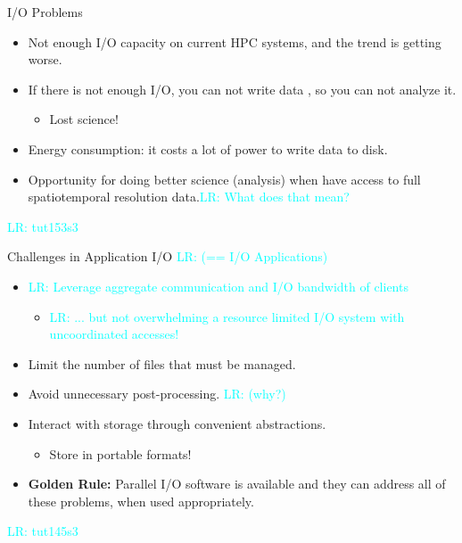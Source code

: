 \documentclass[compress,11pt,xcolor=svgnames,aspectratio=169]{beamer}
\newcommand{\lr}[1]{\textcolor{cyan}{LR: #1}}
\begin{document}
\begin{frame}[fragile]{I/O Problems}

\begin{itemize}
\setlength\itemsep{0.7cm}

\item Not enough I/O capacity on current HPC systems, and the trend is getting worse.

\item If there is not enough I/O, you can not write data%
, so you can not analyze it.
    \begin{itemize}
        \item Lost science!
    \end{itemize}

\item Energy consumption: it costs a lot of power to write data to disk.

\item Opportunity for doing better science (analysis) when have access to full spatiotemporal resolution data.\lr{What does that mean?}

\end{itemize}

\lr{tut153s3}

\end{frame}

\begin{frame}[fragile]{Challenges in Application I/O \lr{(== I/O Applications)}}

\begin{itemize}
\setlength\itemsep{0.4cm}

\item \lr{Leverage aggregate communication and I/O bandwidth of clients}
    \begin{itemize}
        \item \lr{... but not overwhelming a resource limited I/O system with uncoordinated accesses!}
    \end{itemize}

\item Limit the number of files that must be managed.

\item Avoid unnecessary post-processing. \lr{(why?)}

\item Interact with storage through convenient abstractions.
    \begin{itemize}
      \item Store in portable formats!
    \end{itemize}

\item {\color{gold}\textbf{Golden Rule:}} Parallel I/O software is available and they can address all
of these problems, when used appropriately.

\end{itemize}


\lr{tut145s3}

\end{frame}
\end{document}
